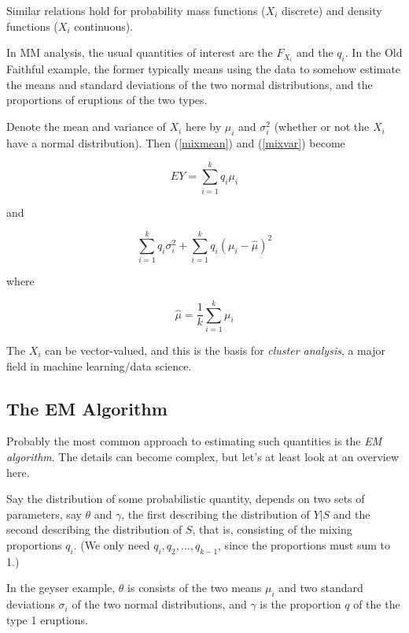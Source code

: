 \documentclass[11pt]{article}
\begin{document}
Similar relations hold for probability mass functions ($X_i$ discrete)
and density functions ($X_i$ continuous).

In MM analysis, the usual quantities of interest are the 
$F_{X_i}$ and the $q_i$.  In the Old Faithful example, the former 
typically means using the data to somehow estimate the means and
standard deviations of the two normal distributions, and the proportions
of eruptions of the two types.

Denote the mean and variance of $X_i$ here by $\mu_i$ and $\sigma_i^2$
(whether or not the $X_i$ have a normal distribution).  Then
(\ref{mixmean}) and (\ref{mixvar}) become

\begin{equation}
\label{EMexpmean}
EY = \sum_{i=1}^k q_i \mu_i
\end{equation}

and

\begin{equation}
\sum_{i=1}^k q_i \sigma_i^2 +
\sum_{i=1}^k q_i (\mu_i - \hat{\mu})^2
\end{equation}

where

\begin{equation}
\hat{\mu} = \frac{1}{k} \sum_{i=1}^k \mu_i
\end{equation}

The $X_i$ can be vector-valued, and this is the basis for
\textit{cluster analysis}, a major field in machine learning/data
science.

\subsection{The EM Algorithm}

Probably the most common approach to estimating such quantities is the
\textit{EM algorithm}.  The details can become complex, but let's at
least look at an overview here.

Say the distribution of some probabilistic quantity, depends on two sets
of parameters, say $\theta$ and $\gamma$, the first describing the
distribution of $Y|S$ and the second describing the distribution of $S$,
that is, consisting of the mixing proportions $q_i$.  (We only need
$q_i,q_2,...,q_{k-1}$, since the proportions must sum to 1.)

In the geyser example, $\theta$ is consists of the two means $\mu_i$ and
two standard deviations $\sigma_i$ of the two normal distributions, and
$\gamma$ is the proportion $q$ of the the type 1 eruptions.  
\end{document}
